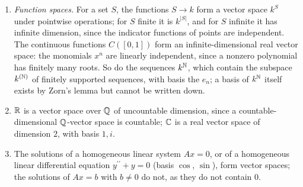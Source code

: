 \begin{example}
\begin{enumerate}
The polynomials of degree at most $d$, together with $0$, form a subspace $k[x]_{\leq d}$, as the coefficients of $f + g$ and $cf$ in degrees above $d$ vanish when those of $f$ and $g$ do. The same argument shows that
$1, x, \ldots, x^d$ is a basis of it, so $\dim k[x]_{\leq d} = d + 1$. Here is a second basis. For distinct $a_0, \ldots, a_d \in k$, the \emph{Lagrange polynomials}
\[
L_i = \prod_{j \neq i}\frac{x - a_j}{a_i - a_j}, \qquad i = 0, \ldots, d,
\]
have degree $d$ and satisfy $L_i(a_l) = 1$ if $l = i$ and $L_i(a_l) = 0$ if $l \neq i$: for $l \neq i$ the factor with $j = l$ vanishes at $a_l$, and at $a_i$ every factor equals $1$. They are independent: evaluating
$\sum_ic_iL_i = 0$ at $a_l$ gives $c_l = 0$. They span: for $p \in k[x]_{\leq d}$, the polynomial $q = p - \sum_ip(a_i)L_i$ lies in $k[x]_{\leq d}$ and vanishes at the $d + 1$ points $a_0, \ldots, a_d$, so $q = 0$, as a
nonzero polynomial of degree at most $d$ has at most $d$ roots (Corollary~\ref{rings:corollary-roots}). So $p = \sum_ip(a_i)L_i$: the coordinates of $p$ in this basis are its values $p(a_i)$. Equivalently
(\emph{Lagrange interpolation}), for any $b_0, \ldots, b_d \in k$ there is exactly one polynomial of degree at most $d$ with $p(a_i) = b_i$ for all $i$, namely $\sum_ib_iL_i$. For instance, through the points $(0, 1)$,
$(1, 3)$, $(2, 7)$ passes exactly one polynomial of degree at most $2$, namely $\frac12(x - 1)(x - 2) - 3x(x - 2) + \frac72x(x - 1) = x^2 + x + 1$.
\item \emph{Function spaces.} For a set $S$, the functions $S \to k$ form a vector space $k^S$ under pointwise operations; for $S$ finite it is $k^{|S|}$, and for $S$ infinite it has infinite
dimension, since the indicator functions of points are independent. The continuous functions $C([0, 1])$ form an infinite-dimensional real vector space: the monomials $x^n$ are linearly
independent, since a nonzero polynomial has finitely many roots. So do the sequences $k^{\mathbb{N}}$, which contain the subspace $k^{(\mathbb{N})}$ of finitely supported sequences, with basis the $e_n$;
a basis of $k^{\mathbb{N}}$ itself exists by Zorn's lemma but cannot be written down.
\item $\mathbb{R}$ is a vector space over $\mathbb{Q}$ of uncountable dimension, since a countable-dimensional $\mathbb{Q}$-vector space is countable; $\mathbb{C}$ is a real vector space of dimension $2$, with basis $1, i$.
\item The solutions of a homogeneous linear system $Ax = 0$, or of a homogeneous linear differential equation $y^{\prime\prime} + y = 0$ (basis $\cos$, $\sin$), form vector spaces; the solutions of
$Ax = b$ with $b \neq 0$ do not, as they do not contain $0$.
\end{enumerate}
\end{example}

